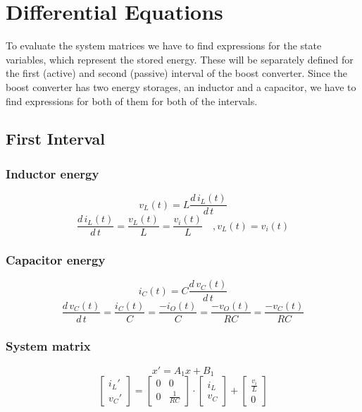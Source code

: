 
\section{Differential Equations}
To evaluate the system matrices we have to find expressions for the state
variables, which represent the stored energy. These will be separately
defined for the first (active) and second (passive) interval of the
boost converter. Since the boost converter has two energy storages,
an inductor and a capacitor, we have to find expressions for both of
them for both of the intervals.

\subsection{First Interval}

\subsubsection{Inductor energy}
\[ 
	v_L(t)
	= L \frac{d\,i_L(t)}{d\,t}
\]
\[
	\frac{d\,i_L(t)}{d\,t}
	= \frac{v_L(t)}{L}
	= \frac{v_i(t)}{L}
	\quad, v_L(t) = v_i(t)
\]

\subsubsection{Capacitor energy}
\[
	i_C(t) 
	= C \frac{d\,v_C(t)}{d\,t}
\]
\[
	\frac{d\,v_C(t)}{d\,t}
	= \frac{i_C(t)}{C}
	= \frac{-i_O(t)}{C}
	= \frac{-v_O(t)}{R C}
	= \frac{-v_C(t)}{R C}
\]

\subsubsection{System matrix}
\[
	x' = A_1 x + B_1
\]
\[
	\begin{bmatrix}
		{i_L}' \\
		{v_C}'
	\end{bmatrix}
	=
	\begin{bmatrix}
		0 	& 0 \\
		0	& \frac{1}{R C}
	\end{bmatrix}
	\cdot
	\begin{bmatrix}
		i_L \\
		v_C
	\end{bmatrix}
	+
	\begin{bmatrix}
		\frac{v_i}{L} \\
		0
	\end{bmatrix}
\]

